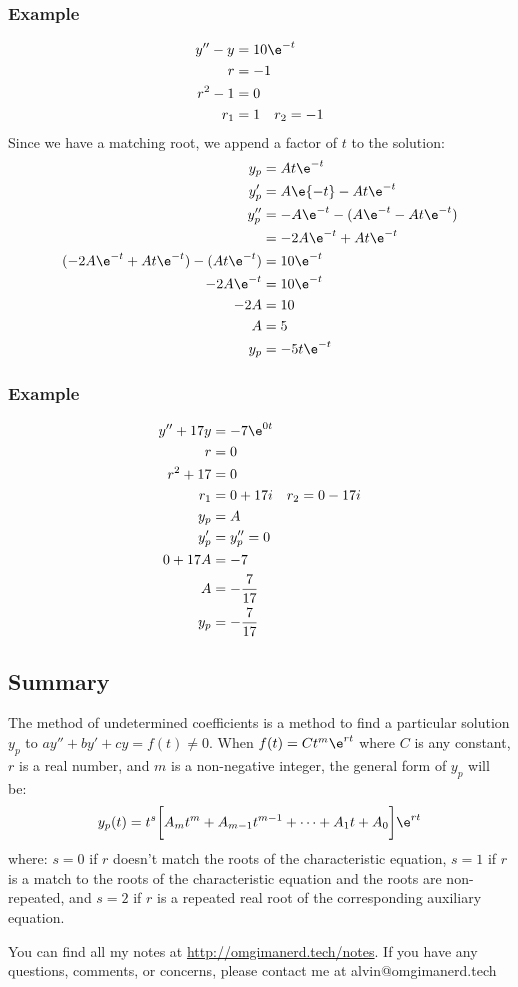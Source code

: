 \documentclass{math}
\begin{document}
\subsubsection*{Example}
\begin{align*}
  y''-y &= 10\e^{-t} \\
  r &= -1 \\
  r^2-1 &= 0 \\
  r_1 &= 1 \quad r_2 = -1
\end{align*}
Since we have a matching root, we append a factor of \( t \) to the solution:
\begin{align*}
  y_p &= At\e^{-t} \\
  y_p' &= A\e{-t}-At\e^{-t} \\
  y_p'' &= -A\e^{-t}-(A\e^{-t}-At\e^{-t}) \\
  &= -2A\e^{-t}+At\e^{-t} \\
  (-2A\e^{-t}+At\e^{-t})-(At\e^{-t}) &= 10\e^{-t} \\
  -2A\e^{-t} &= 10\e^{-t} \\
  -2A &= 10 \\
  A &= 5 \\
  y_p &= -5t\e^{-t}
\end{align*}

\subsubsection*{Example}
\begin{align*}
  y''+17y &= -7\e^{0t} \\
  r &= 0 \\
  r^2+17 &= 0 \\
  r_1 &= 0+17i \quad r_2 = 0-17i \\
  y_p &= A \\
  y_p' &= y_p'' = 0 \\
  0+17A &= -7 \\
  A &= -\frac{7}{17} \\
  y_p &= -\frac{7}{17}
\end{align*}

\subsection*{Summary}
The method of undetermined coefficients is a method to find a particular
solution \( y_p \) to \( ay''+by'+cy = f(t) \ne 0 \). When \( f(t) =
Ct^m\e^{rt} \) where \( C \) is any constant, \( r \) is a real number, and
\( m \) is a non-negative integer, the general form of \( y_p \) will be:
\[ y_p(t) = t^s\bigg[A_mt^m+A_{m-1}t^{m-1}+\dots+A_1t+A_0\bigg]\e^{rt} \]
where:
\( s = 0 \) if \( r \) doesn't match the roots of the characteristic
equation, \( s = 1 \) if \( r \) is a match to the roots of the characteristic
equation and the roots are non-repeated, and \( s = 2 \) if \( r \) is a
repeated real root of the corresponding auxiliary equation.

\begin{center}
  You can find all my notes at \url{http://omgimanerd.tech/notes}. If you have
  any questions, comments, or concerns, please contact me at
  alvin@omgimanerd.tech
\end{center}
\end{document}
